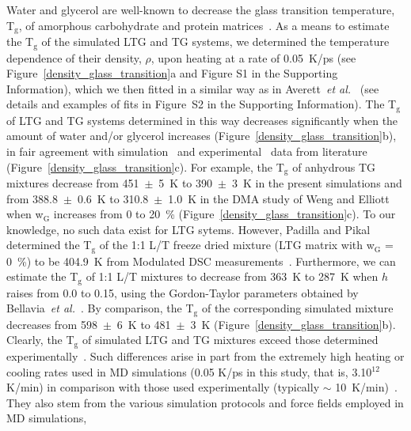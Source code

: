 \documentclass[journal=jpcbfk,manuscript=article]{achemso}
\begin{document}
\begin{singlespacing}
Water and glycerol are well-known to decrease the glass transition temperature, T$_{\textrm{g}}$, of amorphous carbohydrate 
and protein matrices~\cite{Roos1991b,Hancock1994,Lourdin1998,Chen2000,Verbeek2010,Townrow2010,Roussenova2010,Bellavia2011,Roussenova2014,Roussenova2014b,Weng2015}.
As a means to estimate the T$_{\textrm{g}}$ of the simulated LTG and TG systems, we determined the temperature dependence of their
density, $\rho$, upon heating at a rate of 0.05~K/ps (see Figure~\ref{density_glass_transition}a and 
Figure S1 in the Supporting Information), which we then fitted in a similar way as in Averett~\textit{et al.}~\cite{Averett2012} 
(see details and examples of fits in Figure~S2 in the Supporting Information). 
The T$_{\textrm{g}}$ of LTG and TG systems determined in this way decreases significantly 
when the amount of water and/or glycerol increases (Figure~\ref{density_glass_transition}b), in fair agreement with 
simulation~\cite{Dirama2005,Riggleman2008,Averett2012} and experimental~\cite{Chen2000,Cicerone2004,Weng2015} data from 
literature (Figure~\ref{density_glass_transition}c). 
For example, the T$_{\textrm{g}}$ of anhydrous TG mixtures decrease from 451~$\pm$~5~K to 390~$\pm$~3~K in the present simulations and 
from 388.8~$\pm$~0.6~K to 310.8~$\pm$~1.0~K in the DMA study of Weng and Elliott~\cite{Weng2015} when w$_{\textrm{G}}$ increases 
from 0 to 20~\% (Figure~\ref{density_glass_transition}c). To our knowledge, no such data exist for LTG sytems. 
However, Padilla and Pikal determined the T$_{\textrm{g}}$ of the 1:1 L/T freeze dried mixture (LTG matrix with 
w$_{\textrm{G}}$ = 0~\%) to be 404.9~K from Modulated DSC measurements~\cite{Padilla2011}.
Furthermore, we can estimate the T$_{\textrm{g}}$ of 1:1 L/T mixtures to decrease from 363~K to 287~K when $h$ raises from 
0.0 to 0.15, using the Gordon-Taylor parameters obtained by Bellavia~\textit{et al.}~\cite{Bellavia2011}. 
By comparison, 
the T$_{\textrm{g}}$ of the corresponding simulated mixture decreases from 598~$\pm$~6~K to 481~$\pm$~3~K (Figure~\ref{density_glass_transition}b). 
Clearly, the T$_{\textrm{g}}$ of 
simulated LTG and TG mixtures exceed those determined experimentally~\cite{Cicerone2004,Padilla2011,Bellavia2011,Weng2015}. 
Such differences arise in part from the extremely high heating or cooling rates used in MD simulations 
(0.05 K/ps in this study, that is, 3.10$^{\textrm{12}}$ K/min) in comparison with those used experimentally 
(typically $\sim$ 10~K/min)~\cite{Barrat2010,Dirama2005,Riggleman2008,Averett2012}. 
They also stem from the various simulation protocols and force fields employed in MD simulations, 

\end{singlespacing}
\end{document}

